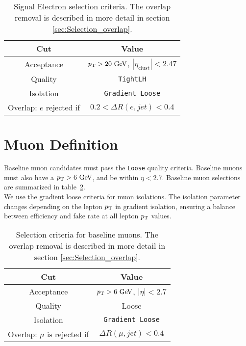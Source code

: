 \begin{table}[htp]
  \caption{Signal Electron selection criteria. The overlap removal is described in more detail in section \ref{sec:Selection_overlap}.}
  \begin{center}
    \begin{tabular}{c|c} \hline \hline
      Cut & Value \\ \hline \hline
      Acceptance & $\pT > 20 \gev$, $|\eta_{\mathrm{clust}}| < 2.47$ \\ \hline
      Quality & {\tt TightLH} \\ \hline
      Isolation & {\tt Gradient Loose} \\ \hline
      Overlap: $e$ rejected if &  $0.2 < \Delta R(e,jet) < 0.4$\\ \hline%
      \hline
    \end{tabular}
  \end{center}
  \label{tb:electrons}
\end{table}%

\section{Muon Definition}  \label{sec:MuonDef}

\indent Baseline muon candidates must pass the {\tt Loose} quality criteria.  Baseline muons must also have a $\pT > 6 \gev$, and be within $\eta < 2.7$.  Baseline muon selections are summarized in table~\ref{tb:muons:baseline}. \\  

\indent We use the gradient loose criteria for muon isolations. The isolation parameter changes depending on the lepton $p_{\mathrm{T}}$ in gradient isolation, ensuring a balance between efficiency and fake rate at all lepton $p_{\mathrm{T}}$ values. \\

\begin{table}[htp]
  \caption{Selection criteria for baseline muons. The overlap removal is described in more detail in section \ref{sec:Selection_overlap}.} 
  \begin{center}
    \begin{tabular}{c|c} \hline \hline
      Cut & Value \\ \hline \hline
      Acceptance & $\pT > 6\gev$, $|\eta| < 2.7$ \\ \hline
      Quality & Loose \\ \hline
      Isolation & {\tt Gradient Loose} \\ \hline
      Overlap: $\mu$ is rejected if &  $ \Delta R(\mu,jet) < 0.4 $ \\ \hline
      \hline
    \end{tabular}
  \end{center}
  \label{tb:muons:baseline}
\end{table}%


